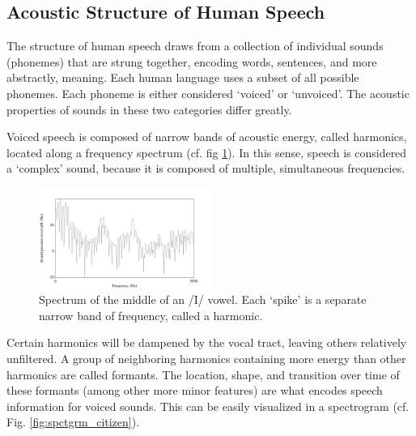 \subsection{Acoustic Structure of Human Speech}

The structure of human speech draws from a collection of individual sounds (phonemes) that are strung together, encoding words, sentences, and more abstractly, meaning.  Each human language uses a subset of all possible phonemes.  Each phoneme is either considered `voiced' or `unvoiced'.  The acoustic properties of sounds in these two categories differ greatly.

Voiced speech is composed of narrow bands of acoustic energy, called harmonics, located along a frequency spectrum (cf. fig \ref{fig:spctrm5k}).  In this sense, speech is considered a `complex' sound, because it is composed of multiple, simultaneous frequencies.
%
\begin{figure}
\centering
  \includegraphics[width=0.5\textwidth]{figure/spctrm5k.png}
  \caption{Spectrum of the middle of an /I/ vowel.  Each `spike' is a separate narrow band of frequency, called a harmonic.}
  \label{fig:spctrm5k}
\end{figure}
%
Certain harmonics will be dampened by the vocal tract, leaving others relatively unfiltered.  A group of neighboring harmonics containing more energy than other harmonics are called formants.  The location, shape, and transition over time of these formants (among other more minor features) are what encodes speech information for voiced sounds.  This can be easily visualized in a spectrogram (cf. Fig. \ref{fig:spctgrm_citizen}).

